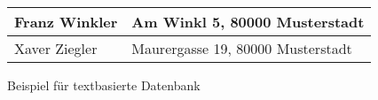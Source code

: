 \begin{figure}[htb]
\centering
\begin{tabular}{p{}|p{}}
\hline
Franz Winkler & Am Winkl 5, 80000 Musterstadt\\ \hline
Xaver Ziegler & Maurergasse 19, 80000 Musterstadt\\ \hline
\end{tabular}
\caption{Beispiel für textbasierte Datenbank}
\end{figure}





